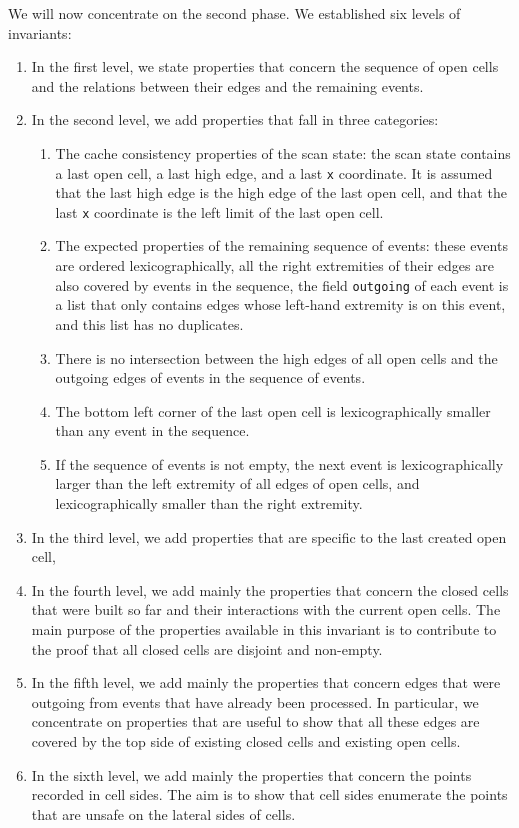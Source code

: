 \documentclass[a4paper, USenglish, cleveref, autoref, thm-restate, final]{lipics-v2021}
\begin{document}
We will now concentrate on the second phase.
We established six levels of invariants:
\begin{enumerate}
\item In the first level, we state properties that concern the
sequence of open cells and the relations between their edges and the remaining
events.
\item In the second level, we add properties that fall in three categories:
  \begin{enumerate}
    \item The cache consistency properties of
  the scan state: the scan state contains a last open cell, a last high edge,
  and a last {\tt x} coordinate.  It is assumed that the last high edge
  is the high edge of the last open cell, and that the last {\tt x} coordinate
  is the left limit of the last open cell.
\item The expected properties of the remaining sequence of events: these
  events are ordered lexicographically, all the right extremities of their
  edges are also covered by events in the sequence, the field {\tt outgoing}
  of each event is a list that only contains edges whose left-hand extremity
  is on this event, and this list has no duplicates.
\item There is no intersection between the high edges of all open cells
  and the outgoing edges of events in the sequence of events.
\item The bottom left corner of the last open cell is lexicographically
  smaller than any event in the sequence.
\item If the sequence of events is not empty, the next event is
  lexicographically larger than the left extremity of all edges of
  open cells, and lexicographically smaller than the right extremity.
\end{enumerate}
\item In the third level, we add properties that are specific to the
  last created open cell,
\item In the fourth level, we add mainly the properties that concern
  the closed cells that were built so far and their interactions with
  the current open cells.  The main purpose of the properties
  available in this invariant is to contribute to the proof that
  all closed cells are disjoint and non-empty.
\item In the fifth level, we add mainly the properties that concern
  edges that were outgoing from events that have already been processed.
  In particular, we concentrate on properties that are useful to show that
  all these edges are covered by the top side of existing closed cells and
  existing open cells.
\item In the sixth level, we add mainly the properties that concern
  the points recorded in cell sides.  The aim is to show that cell
  sides enumerate the points that are unsafe on the lateral
  sides of cells.
\end{enumerate}
\end{document}
